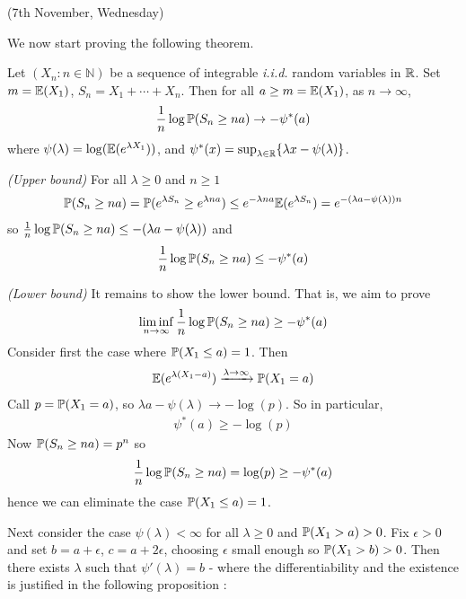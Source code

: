 \documentclass[12pt,a4paper]{report}
\newenvironment{proof}
{\begin{changemargin}{1cm}{0.5cm} 
	}%
	{\end{changemargin}
}
\begin{document}
\s

\newday

(7th November, Wednesday)
\s

We now start proving the following theorem.
\s

 Let $(X_n : n\in \mathbb{N})$ be a sequence of integrable \emph{i.i.d.} random variables in $\mathbb{R}$. Set $m = \mathbb{E}(X_1)$, $S_n = X_1 + \cdots + X_n$. Then for all $a\geq m = \mathbb{E}(X_1)$, as $n\rightarrow \infty$,
\begin{align*}
\frac{1}{n} \log \mathbb{P} (S_n \geq na) \rightarrow -\psi^*(a)
\end{align*}
where  $\psi (\lambda) = \log (\mathbb{E}(e^{\lambda X_1}))$, and $\psi^* (x) = \sup_{\lambda \in \mathbb{R}} \{ \lambda x - \psi(\lambda) \}$.
\begin{proof}
\pf \emph{(Upper bound)} For all $\lambda \geq 0$ and $n\geq 1$
\begin{align*}
\mathbb{P}(S_n \geq na) = \mathbb{P}(e^{\lambda S_n} \geq e^{\lambda na} ) \leq e^{-\lambda na} \mathbb{E}(e^{\lambda S_n})= e^{-(\lambda a -\psi(\lambda))n}
\end{align*}
so $\frac{1}{n} \log \mathbb{P}(S_n \geq na) \leq -(\lambda a -\psi(\lambda))$ and 
\begin{align*}
\frac{1}{n} \log \mathbb{P} (S_n \geq na) \leq -\psi^* (a)
\end{align*}

\emph{(Lower bound)} It remains to show the lower bound. That is, we aim to prove
\begin{align*}
\liminf_{n\rightarrow \infty} \frac{1}{n} \log \mathbb{P} (S_n \geq na) \geq - \psi^* (a)
\end{align*}
Consider first the case where $\mathbb{P}(X_1 \leq a) = 1$. Then
\begin{align*}
\mathbb{E}(e^{\lambda(X_1-a)}) \xrightarrow{\lambda \rightarrow \infty} \mathbb{P}(X_1 =a)
\end{align*}
Call $p = \mathbb{P}(X_1 =a)$, so $\lambda a - \psi(\lambda) \rightarrow -\log (p)$. So in particular,
\begin{align*}
\psi^* (a) \geq -\log (p)
\end{align*}
Now $\mathbb{P} (S_n \geq na) = p^n$ so
\begin{align*}
\frac{1}{n} \log \mathbb{P}(S_n \geq na) = \log (p) \geq -\psi^*(a)
\end{align*}
hence we can eliminate the case $\mathbb{P}(X_1 \leq a) = 1$.
\s

\quad Next consider the case $\psi(\lambda) < \infty$ for all $\lambda \geq 0$ and $\mathbb{P}(X_1 > a) >0$. Fix $\epsilon >0$ and set $b = a+ \epsilon$, $c= a+ 2\epsilon$, choosing $\epsilon$ small enough so $\mathbb{P}(X_1 > b)>0$. Then there exists $\lambda$ such that $\psi'(\lambda) = b$ - where the differentiability and the existence is justified in the following proposition :


\end{proof}
\end{document}
